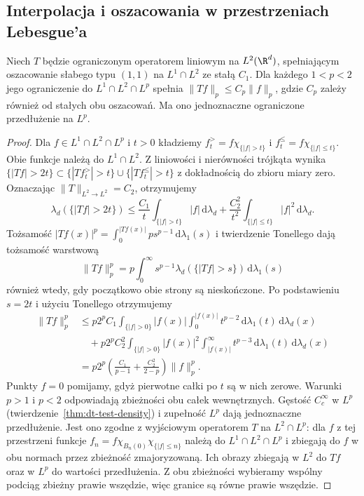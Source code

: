 \subsection{Interpolacja i oszacowania w przestrzeniach Lebesgue'a}
\begin{lemat}
\label{lem:dt-cz-interp}
Niech $T$ będzie ograniczonym operatorem liniowym
na $L^2(\R^d)$, spełniającym oszacowanie słabego typu
$(1,1)$ na $L^1\cap L^2$ ze stałą $C_1$.
Dla każdego $1<p<2$ jego ograniczenie do
$L^1\cap L^2\cap L^p$ spełnia
$\|Tf\|_p\le C_p\|f\|_p$, gdzie $C_p$ zależy również
od stałych obu oszacowań. Ma ono jednoznaczne
ograniczone przedłużenie na $L^p$.
\end{lemat}
\begin{proof}
Dla $f\in L^1\cap L^2\cap L^p$ i $t>0$ kładziemy
$f_t^{>}=f\chi_{\{|f|>t\}}$ i
$f_t^{\le}=f\chi_{\{|f|\le t\}}$.
Obie funkcje należą do $L^1\cap L^2$.
Z liniowości i nierówności trójkąta wynika
$\{|Tf|>2t\}\subset\{|Tf_t^{>}|>t\}
\cup\{|Tf_t^{\le}|>t\}$ z dokładnością do zbioru
miary zero. Oznaczając $\|T\|_{L^2\to L^2}=C_2$,
otrzymujemy
\[
 \lambda_d(\{|Tf|>2t\})
 \le \frac{C_1}{t}\int_{\{|f|>t\}}|f|\,\mathrm d\lambda_d
 +\frac{C_2^2}{t^2}\int_{\{|f|\le t\}}|f|^2\,\mathrm d\lambda_d .
\]
Tożsamość
$|Tf(x)|^p=\int_0^{|Tf(x)|}p s^{p-1}\,\mathrm d\lambda_1(s)$
i twierdzenie Tonellego dają tożsamość warstwową
\[
 \|Tf\|_p^p=p\int_0^\infty s^{p-1}
 \lambda_d(\{|Tf|>s\})\,\mathrm d\lambda_1(s)
\]
również wtedy, gdy początkowo obie strony są nieskończone.
Po podstawieniu $s=2t$ i użyciu Tonellego otrzymujemy
\[
 \begin{aligned}
 \|Tf\|_p^p
 &\le p2^p C_1\int_{\{|f|>0\}} |f(x)|
       \int_0^{|f(x)|}t^{p-2}\,\mathrm d\lambda_1(t)
       \,\mathrm d\lambda_d(x)\\
 &\quad+p2^p C_2^2\int_{\{|f|>0\}} |f(x)|^2
       \int_{|f(x)|}^\infty t^{p-3}\,\mathrm d\lambda_1(t)
       \,\mathrm d\lambda_d(x)\\
 &=p2^p\left(\frac{C_1}{p-1}+\frac{C_2^2}{2-p}\right)
   \|f\|_p^p .
 \end{aligned}
\]
Punkty $f=0$ pomijamy, gdyż pierwotne całki po $t$
są w nich zerowe. Warunki $p>1$ i $p<2$ odpowiadają
zbieżności obu całek wewnętrznych.
Gęstość $C_c^\infty$ w $L^p$
(twierdzenie~\ref{thm:dt-test-density}) i zupełność $L^p$
dają jednoznaczne przedłużenie.
Jest ono zgodne z wyjściowym operatorem $T$ na
$L^2\cap L^p$: dla $f$ z tej przestrzeni funkcje
$f_n=f\chi_{B_n(0)}\chi_{\{|f|\le n\}}$
należą do $L^1\cap L^2\cap L^p$ i zbiegają do $f$
w obu normach przez zbieżność zmajoryzowaną.
Ich obrazy zbiegają w $L^2$ do $Tf$ oraz w $L^p$
do wartości przedłużenia. Z obu zbieżności wybieramy
wspólny podciąg zbieżny prawie wszędzie, więc granice
są równe prawie wszędzie.
\end{proof}


